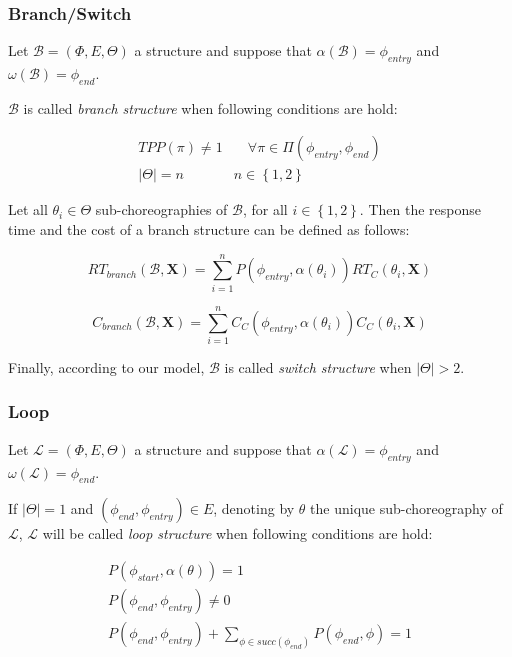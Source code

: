 \subsubsection{Branch/Switch}

Let $\mathcal{B} = (\Phi,E,\Theta)$ a structure and suppose that $\alpha(\mathcal{B}) = \phi_{entry}$ and $\omega(\mathcal{B}) = \phi_{end}$. 

$\mathcal{B}$ is called \textit{branch structure} when following conditions are hold:

\begin{eqnarray}
	TPP(\pi) \neq 1  & \quad \forall \pi \in \Pi(\phi_{entry}, \phi_{end}) \\
    |\Theta| = n  & n \in \left\lbrace 1,2 \right\rbrace 
\end{eqnarray}

Let all $\theta_i \in \Theta$ sub-choreographies of $\mathcal{B}$, for all $i \in \left\lbrace 1,2 \right\rbrace $. Then the response time and the cost of a branch structure can be defined as follows:

\begin{equation}
	RT_{branch}(\mathcal{B}, \textbf{X}) = \sum_{i = 1}^n P(\phi_{entry}, \alpha(\theta_i)) RT_C(\theta_i, \textbf{X})
\end{equation}

\begin{equation}
	C_{branch}(\mathcal{B}, \textbf{X}) = \sum_{i = 1}^n C_C(\phi_{entry}, \alpha(\theta_i)) C_C(\theta_i, \textbf{X})
\end{equation}

Finally, according to our model, $\mathcal{B}$ is called \textit{switch structure} when $|\Theta| > 2$.

\subsubsection{Loop}

Let $\mathcal{L} = (\Phi,E,\Theta)$ a structure and suppose that $\alpha(\mathcal{L}) = \phi_{entry}$ and $\omega(\mathcal{L}) = \phi_{end}$. 

If $|\Theta| = 1$ and $(\phi_{end}, \phi_{entry}) \in E$, denoting by $\theta$ the unique sub-choreography of $\mathcal{L}$, $\mathcal{L}$ will be called \textit{loop structure} when following conditions are hold:

\begin{eqnarray}
	P(\phi_{start}, \alpha(\theta)) = 1 \\
	P(\phi_{end}, \phi_{entry}) \neq 0 \\
	P(\phi_{end}, \phi_{entry}) + \sum_{\phi \in succ(\phi_{end})} P(\phi_{end}, \phi) = 1
\end{eqnarray}

